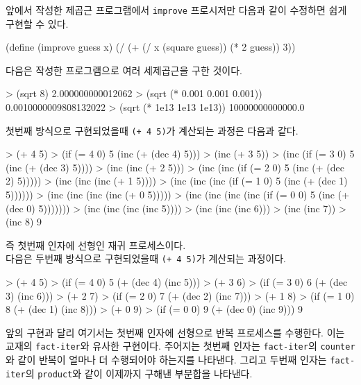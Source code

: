 앞에서 작성한 제곱근 프로그램에서 \texttt{improve} 프로시저만 다음과 같이
수정하면 쉽게 구현할 수 있다.

\begin{lisp}
(define (improve guess x)
  (/ (+ (/ x (square guess)) (* 2 guess)) 3))
\end{lisp}

다음은 작성한 프로그램으로 여러 세제곱근을 구한 것이다.
\begin{lisp}
> (sqrt 8)
2.000000000012062
> (sqrt (* 0.001 0.001 0.001))
0.0010000009808132022
> (sqrt (* 1e13 1e13 1e13))
10000000000000.0
\end{lisp}


첫번째 방식으로 구현되었을때 \texttt{(+ 4 5)}가 계산되는 과정은 다음과 같다.

\begin{lisp}
> (+ 4 5)
> (if (= 4 0) 5 (inc (+ (dec 4) 5)))
> (inc (+ 3 5))
> (inc (if (= 3 0) 5 (inc (+ (dec 3) 5))))
> (inc (inc (+ 2 5)))
> (inc (inc (if (= 2 0) 5 (inc (+ (dec 2) 5)))))
> (inc (inc (inc (+ 1 5))))
> (inc (inc (inc (if (= 1 0) 5 (inc (+ (dec 1) 5))))))
> (inc (inc (inc (inc (+ 0 5)))))
> (inc (inc (inc (inc (if (= 0 0) 5 (inc (+ (dec 0) 5)))))))
> (inc (inc (inc (inc 5))))
> (inc (inc (inc 6)))
> (inc (inc 7))
> (inc 8)
9
\end{lisp}

즉 첫번째 인자에 선형인 재귀 프로세스이다.\\

다음은 두번째 방식으로 구현되었을때 \texttt{(+ 4 5)}가 계산되는 과정이다.

\begin{lisp}
> (+ 4 5)
> (if (= 4 0) 5 (+ (dec 4) (inc 5)))
> (+ 3 6)
> (if (= 3 0) 6 (+ (dec 3) (inc 6)))
> (+ 2 7)
> (if (= 2 0) 7 (+ (dec 2) (inc 7)))
> (+ 1 8)
> (if (= 1 0) 8 (+ (dec 1) (inc 8)))
> (+ 0 9)
> (if (= 0 0) 9 (+ (dec 0) (inc 9)))
9
\end{lisp}

앞의 구현과 달리 여기서는 첫번째 인자에 선형으로 반복 프로세스를
수행한다. 이는 교재의 \texttt{fact-iter}와 유사한 구현이다. 주어지는 첫번째
인자는 \texttt{fact-iter}의 \texttt{counter}와 같이 반복이 얼마나 더
수행되어야 하는지를 나타낸다. 그리고 두번째 인자는 \texttt{fact-iter}의
\texttt{product}와 같이 이제까지 구해낸 부분합을 나타낸다.


